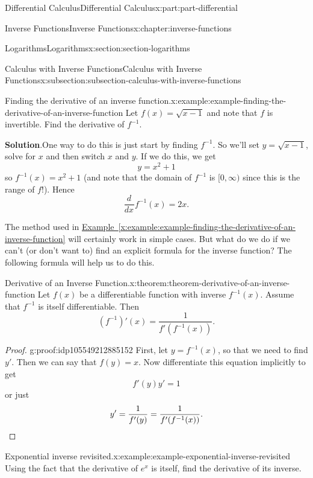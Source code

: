 \documentclass[twoside,10pt,]{book}
\newcommand{\blocktitlefont}{\relax}
\newcommand{\xreffont}{\relax}
\numberwithin{equation}{part}
\newcommand{\qedhere}{\relax}
\newcommand{\dv}[3][]{\dfrac{d^{#1} #2}{d #3^{#1}}}
\begin{document}
\begin{partptx}{Differential Calculus}{}{Differential Calculus}{}{}{x:part:part-differential}
\begin{chapterptx}{Inverse Functions}{}{Inverse Functions}{}{}{x:chapter:inverse-functions}
\begin{sectionptx}{Logarithms}{}{Logarithms}{}{}{x:section:section-logarithms}
\begin{subsectionptx}{Calculus with Inverse Functions}{}{Calculus with Inverse Functions}{}{}{x:subsection:subsection-calculus-with-inverse-functions}
\begin{example}{Finding the derivative of an inverse function.}{x:example:example-finding-the-derivative-of-an-inverse-function}
Let \(f(x) = \sqrt{x-1}\) and note that \(f\) is invertible. Find the derivative of \(f^{-1}\).%
\par\smallskip%
\noindent\textbf{\blocktitlefont Solution}.\hypertarget{g:solution:idp105549212876448}{}\quad{}One way to do this is just start by finding \(f^{-1}\). So we'll set \(y = \sqrt{x-1}\), solve for \(x\) and then switch \(x\) and \(y\). If we do this, we get%
\begin{equation*}
y = x^{2} + 1
\end{equation*}
so \(f^{-1}(x) = x^{2} + 1\) (and note that the domain of \(f^{-1}\) is \([0,\infty)\) since this is the range of \(f\)!). Hence%
\begin{equation*}
\dv{}{x}f^{-1}(x) = 2x.
\end{equation*}
%
\end{example}
The method used in \hyperref[x:example:example-finding-the-derivative-of-an-inverse-function]{Example~{\xreffont\ref{x:example:example-finding-the-derivative-of-an-inverse-function}}} will certainly work in simple cases. But what do we do if we can't (or don't want to) find an explicit formula for the inverse function? The following formula will help us to do this.%
\begin{theorem}{Derivative of an Inverse Function.}{}{x:theorem:theorem-derivative-of-an-inverse-function}%
%
Let \(f(x)\) be a differentiable function with inverse \(f^{-1}(x)\). Assume that \(f^{-1}\) is itself differentiable. Then%
\begin{equation*}
(f^{-1})'(x) = \frac{1}{f'(f^{-1}(x))}.
\end{equation*}
%
\end{theorem}
\begin{proof}{}{g:proof:idp105549212885152}
First, let \(y = f^{-1}(x)\), so that we need to find \(y'\). Then we can say that \(f(y) = x\). Now differentiate this equation implicitly to get%
\begin{equation*}
f'(y)y' = 1
\end{equation*}
or just%
\begin{equation*}
y' = \frac{1}{f'(y)} = \frac{1}{f'(f^{-1}(x))}.\qedhere
\end{equation*}
%
\end{proof}
\begin{example}{Exponential inverse revisited.}{x:example:example-exponential-inverse-revisited}%
Using the fact that the derivative of \(e^{x}\) is itself, find the derivative of its inverse.%
\par\smallskip%

\end{example}
\end{subsectionptx}
\end{sectionptx}
\end{chapterptx}
\end{partptx}
\end{document}
